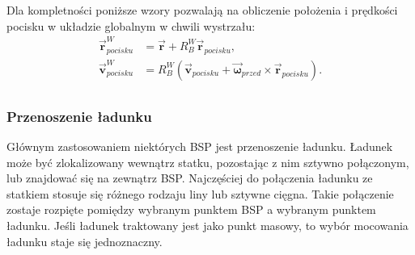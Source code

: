 Dla kompletności poniższe wzory pozwalają na obliczenie położenia i prędkości pocisku w układzie globalnym w chwili wystrzału:
\[
	\begin{aligned}
	\vec{\bm{r}}_{pocisku}^W & = \vec{\bm{r}} + R_B^W \vec{\bm{r}}_{pocisku},\\
	\vec{\bm{v}}_{pocisku}^W & =  R_B^W \left( \vec{\bm{v}}_{pocisku} + \vec{\bm{\omega}}_{przed} \times \vec{\bm{r}}_{pocisku} \right).\\
	\end{aligned}
\]



\subsubsection{Przenoszenie ładunku}

Głównym zastosowaniem niektórych BSP jest przenoszenie ładunku. Ładunek może być zlokalizowany wewnątrz statku, pozostając z nim sztywno połączonym, lub znajdować się na zewnątrz BSP. Najczęściej do połączenia ładunku ze statkiem stosuje się różnego rodzaju liny lub sztywne cięgna. Takie połączenie zostaje rozpięte pomiędzy wybranym punktem BSP a wybranym punktem ładunku. Jeśli ładunek traktowany jest jako punkt masowy, to wybór mocowania ładunku staje się jednoznaczny.\\

